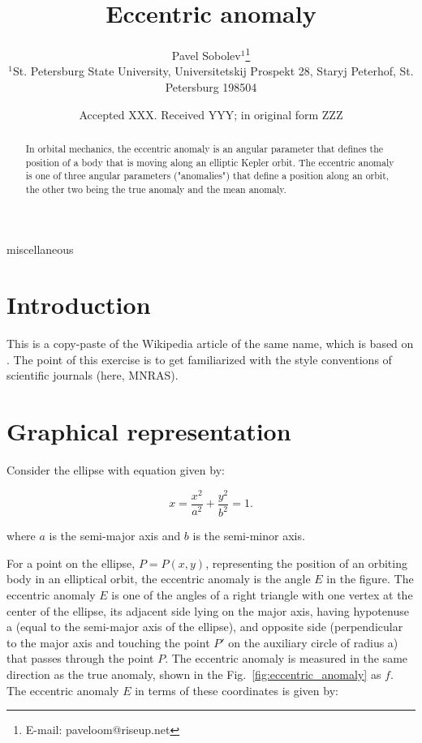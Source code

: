 \documentclass[fleqn,usenatbib]{mnras}
\title[Short title, max. 45 characters]{Eccentric anomaly}
\author[Pavel Sobolev]{
Pavel Sobolev$^{1}$\thanks{E-mail: paveloom@riseup.net}
\\
$^{1}$St. Petersburg State University, Universitetskij Prospekt 28, Staryj Peterhof, St. Petersburg 198504\\
}
\date{Accepted XXX. Received YYY; in original form ZZZ}
\begin{document}
\label{firstpage}
\pagerange{\pageref{firstpage}--\pageref{lastpage}}
\maketitle

\begin{abstract}
In orbital mechanics, the eccentric anomaly is an angular
parameter that defines the position of a body that is moving
along an elliptic Kepler orbit. The eccentric anomaly is one
of three angular parameters ("anomalies") that define a position
along an orbit, the other two being the true anomaly and the mean
anomaly.
\end{abstract}

\begin{keywords}
miscellaneous
\end{keywords}



\section{Introduction}

This is a copy-paste of the Wikipedia article of the same name, which
is based on \citet{Murray1999, Plummer1960}. The point of this exercise
is to get familiarized with the style conventions of scientific journals
(here, MNRAS).

\section{Graphical representation}

Consider the ellipse with equation given by:

\begin{equation}
  x=\frac{x^2}{a^2} + \frac{y^2}{b^2} = 1.
  \label{eq:ellipse}
\end{equation}

where $a$ is the semi-major axis and $b$ is the semi-minor axis.

For a point on the ellipse, $ P = P(x, y) $, representing the position
of an orbiting body in an elliptical orbit, the eccentric anomaly is
the angle $E$ in the figure. The eccentric anomaly $E$ is one of the
angles of a right triangle with one vertex at the center of the ellipse,
its adjacent side lying on the major axis, having hypotenuse a (equal
to the semi-major axis of the ellipse), and opposite side (perpendicular
to the major axis and touching the point $P'$ on the auxiliary circle of
radius a) that passes through the point $P$. The eccentric anomaly is
measured in the same direction as the true anomaly, shown in the
Fig.~\ref{fig:eccentric_anomaly} as $f$. The eccentric anomaly $E$ in
terms of these coordinates is given by:
\end{document}
